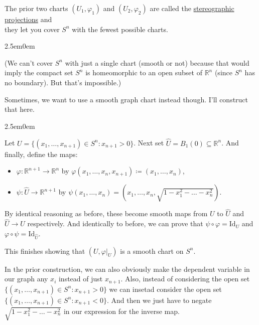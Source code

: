 \documentclass{book}
\newcommand{\myComment}{%
   \color{RawerSienna}%
   \fontsize{12}{14}\selectfont%
}
\newcommand{\pracTwo}{
   \color{Orange}%
   \fontsize{12}{14}\selectfont%
}
\newenvironment{myIndent}{%
   \begin{adjustwidth}{2.5em}{0em}%
}{%
   \end{adjustwidth}%
}
\newcommand{\udefine}[1]{{%
   \setulcolor{Red}%
   \setul{0.14em}{0.07em}%
   \ul{#1}%
}}
\newcommand{\myId}{\mathrm{Id}}
\newcommand{\retTwo}{\hfill\bigbreak}
\begin{document}
The prior two charts $(U_1, \varphi_1)$ and $(U_2, \varphi_2)$ are called the \udefine{stereographic projections} and\\ they let you cover $S^n$ with the fewest possible charts.
\begin{myIndent}\myComment
	(We can't cover $S^n$ with just a single chart (smooth or not) because that would imply the compact set $S^n$ is homeomorphic to an open subset of $\mathbb{R}^n$ (since $S^n$ has no boundary). But that's impossible.)\newpage
\end{myIndent}

Sometimes, we want to use a smooth graph chart instead though. I'll construct that here.
\begin{myIndent}\pracTwo
	Let $U = \{(x_1, \ldots, x_{n+1}) \in S^{n} : x_{n+1} > 0\}$. Next set $\widehat{U} = B_1(0) \subseteq \mathbb{R}^n$. And finally, define the maps:
	\begin{itemize}
		\item $\varphi: \mathbb{R}^{n+1} \to \mathbb{R}^n$ by $\varphi(x_1, \ldots, x_n, x_{n+1}) \coloneqq (x_1, \ldots, x_n)$,
		\item $\psi: \widehat{U} \to \mathbb{R}^{n+1}$ by $\psi(x_1, \ldots, x_n) = (x_1, \ldots, x_n, \sqrt{1 - x_1^2 - \ldots - x_n^2})$.\retTwo
	\end{itemize}

	By identical reasoning as before, these become smooth maps from $U$ to $\widehat{U}$ and $\widehat{U} \to U$ respectively. And identically to before, we can prove that $\psi \circ \varphi = \myId_U$ and $\varphi \circ \psi = \myId_{\widehat{U}}$.\retTwo

	This finishes showing that $(U, \varphi|_{U})$ is a smooth chart on $S^{n}$.\retTwo
\end{myIndent}

In the prior construction, we can also obviously make the dependent variable in\\ our graph any $x_i$ instead of just $x_{n+1}$. Also, instead of considering the open set\\ $\{(x_1, \ldots, x_{n+1}) \in S^{n} : x_{n+1} > 0\}$ we can insetad consider the open set\\ $\{(x_1, \ldots, x_{n+1}) \in S^{n} : x_{n+1} < 0\}$. And then we just have to negate $\sqrt{1 - x_1^2 - \ldots - x_n^2}$ in our expression for the inverse map.\retTwo
\end{document}
